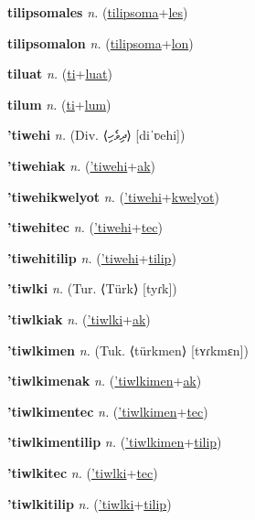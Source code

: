 \textbf{\hypertarget{tilipsomales}{tilipsomales}} \textit{n.} (\hyperlink{tilipsoma}{tilipsoma}+\allowbreak \hyperlink{les}{les})


\textbf{\hypertarget{tilipsomalon}{tilipsomalon}} \textit{n.} (\hyperlink{tilipsoma}{tilipsoma}+\allowbreak \hyperlink{lon}{lon})


\textbf{\hypertarget{tiluat}{tiluat}} \textit{n.} (\hyperlink{ti}{ti}+\allowbreak \hyperlink{luat}{luat})


\textbf{\hypertarget{tilum}{tilum}} \textit{n.} (\hyperlink{ti}{ti}+\allowbreak \hyperlink{lum}{lum})


\textbf{\hypertarget{'tiwehi}{'tiwehi}} \textit{n.} (Div. ⟨{\thaana{}ދިވެހި}⟩ [diˈʋehi])


\textbf{\hypertarget{'tiwehiak}{'tiwehiak}} \textit{n.} (\hyperlink{'tiwehi}{'tiwehi}+\allowbreak \hyperlink{ak}{ak})


\textbf{\hypertarget{'tiwehikwelyot}{'tiwehikwelyot}} \textit{n.} (\hyperlink{'tiwehi}{'tiwehi}+\allowbreak \hyperlink{kwelyot}{kwelyot})


\textbf{\hypertarget{'tiwehitec}{'tiwehitec}} \textit{n.} (\hyperlink{'tiwehi}{'tiwehi}+\allowbreak \hyperlink{tec}{tec})


\textbf{\hypertarget{'tiwehitilip}{'tiwehitilip}} \textit{n.} (\hyperlink{'tiwehi}{'tiwehi}+\allowbreak \hyperlink{tilip}{tilip})


\textbf{\hypertarget{'tiwlki}{'tiwlki}} \textit{n.} (Tur. ⟨Türk⟩ [tyɾk])


\textbf{\hypertarget{'tiwlkiak}{'tiwlkiak}} \textit{n.} (\hyperlink{'tiwlki}{'tiwlki}+\allowbreak \hyperlink{ak}{ak})


\textbf{\hypertarget{'tiwlkimen}{'tiwlkimen}} \textit{n.} (Tuk. ⟨türkmen⟩ [tʏɾkmɛn])


\textbf{\hypertarget{'tiwlkimenak}{'tiwlkimenak}} \textit{n.} (\hyperlink{'tiwlkimen}{'tiwlkimen}+\allowbreak \hyperlink{ak}{ak})


\textbf{\hypertarget{'tiwlkimentec}{'tiwlkimentec}} \textit{n.} (\hyperlink{'tiwlkimen}{'tiwlkimen}+\allowbreak \hyperlink{tec}{tec})


\textbf{\hypertarget{'tiwlkimentilip}{'tiwlkimentilip}} \textit{n.} (\hyperlink{'tiwlkimen}{'tiwlkimen}+\allowbreak \hyperlink{tilip}{tilip})


\textbf{\hypertarget{'tiwlkitec}{'tiwlkitec}} \textit{n.} (\hyperlink{'tiwlki}{'tiwlki}+\allowbreak \hyperlink{tec}{tec})


\textbf{\hypertarget{'tiwlkitilip}{'tiwlkitilip}} \textit{n.} (\hyperlink{'tiwlki}{'tiwlki}+\allowbreak \hyperlink{tilip}{tilip})


